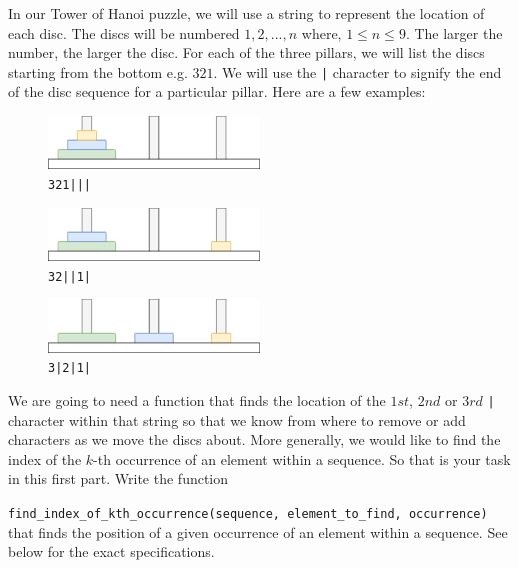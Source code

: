 
In our Tower of Hanoi puzzle, we will use a string to represent the location of each disc.
The discs will be numbered $1, 2, ..., n$ where, $1 \leq n \leq 9$.
The larger the number, the larger the disc.
For each of the three pillars, we will list the discs starting from the bottom e.g. $321$.
We will use the \texttt{|} character to signify the end of the disc sequence for a particular pillar.
Here are a few examples:

\begin{figure}[h]
    \centering
    \includegraphics[width=0.5\textwidth]{1}
    \caption{\texttt{321|||}}
\end{figure}

\begin{figure}[h]
    \centering
    \includegraphics[width=0.5\textwidth]{2}
    \caption{\texttt{32||1|}}
\end{figure}

\begin{figure}[h]
    \centering
    \includegraphics[width=0.5\textwidth]{3}
    \caption{\texttt{3|2|1|}}
\end{figure}

We are going to need a function
that finds the location of the $1st$, $2nd$ or $3rd$ \texttt{|} character within that string
so that we know from where to remove or add characters as we move the discs about.
More generally, we would like to find the index of the $k$-th occurrence of an element
within a sequence.
So that is your task in this first part. Write the function

\texttt{find\_index\_of\_kth\_occurrence(sequence, element\_to\_find, occurrence)}\\
that finds the position of a given occurrence of an element within a sequence.
See below for the exact specifications.

